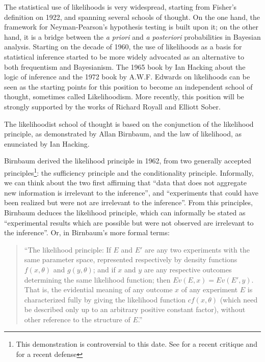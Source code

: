 \documentclass[twoside,12pt,a4paper]{article}
\begin{document}
The statistical use of likelihoods is very widespread, starting from Fisher's definition on 1922, and
spanning several schools of thought. 
On the one hand, the framework for Neyman-Pearson's hypothesis testing is built upon it; on the other hand,
it is a bridge between the {\em a priori} and {\em a posteriori} probabilities in Bayesian analysis. 
Starting on the decade of 1960, the use of likelihoods as a basis for statistical inference started to be
more widely advocated as an alternative to both frequentism and Bayesianism. The 1965 book by Ian Hacking 
about the logic of inference and the 1972 book by A.W.F. Edwards on likelihoods can be seen as the starting
points for this position to become an independent school of thought, sometimes called Likelihoodism.
More recently, this position will be strongly supported by the works of Richard Royall and Elliott Sober.

The likelihoodist school of thought is based on the conjunction of the likelihood principle, as demonstrated
by Allan Birnbaum, and the law of likelihood, as enunciated by Ian Hacking.

Birnbaum derived the likelihood principle in 1962, from two generally accepted principles\footnote{
This demonstration is controversial to this date. See \citep{Mayo10} for a recent critique and 
\citep{Gandenberger12} for a recent defense}: the sufficiency principle and the conditionality principle.
Informally, we can think about the two first affirming that ``data that does not aggregate new information
is irrelevant to the inference'', and ``experiments that could have been realized but were not are irrelevant
to the inference''. From this principles, Birnbaum deduces the likelihood principle, which can informally
be stated as ``experimental results which are possible but were not observed are irrelevant to the 
inference''. Or, in Birnbaum's more formal terms:

\begin{quote}
``The likelihood principle: If $E$ and $E\prime$ are any two experiments with the same parameter space,
 represented respectively by density functions $f(x, \theta)$ and $g(y, \theta)$; and if $x$ and $y$ are
 any respective outcomes determining the same likelihood function; then $Ev(E, x) = Ev(E\prime, y)$.
 That is, the evidential meaning of any outcome $x$ of any experiment $E$ is characterized fully by giving
 the likelihood function $cf(x, \theta)$ (which need be described only up to an arbitrary positive constant
 factor), without other reference to the structure of $E$.''
\citep{Birnbaum62}
\end{quote}
\end{document}
